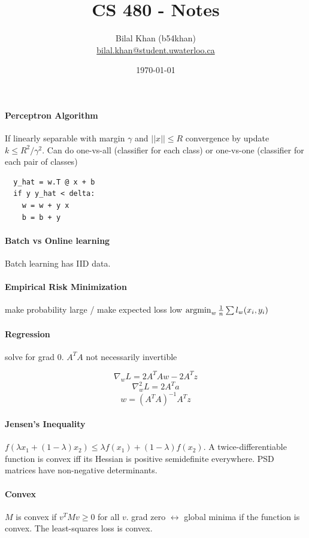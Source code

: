 \documentclass[11pt]{article}
\title{CS 480 - Notes}
\author{Bilal Khan (b54khan)\\
\href{mailto:bilal.khan@student.uwaterloo.ca}{bilal.khan@student.uwaterloo.ca}}
\date{\today}
\begin{document}
\maketitle

\paragraph{Perceptron Algorithm} If linearly separable with margin $\gamma$ and $||x|| \leq R$ convergence by update $k \leq R^2 / \gamma^2$. Can do one-vs-all (classifier for each class) or one-vs-one (classifier for each pair of classes)

\begin{verbatim}
  y_hat = w.T @ x + b
  if y y_hat < delta:
    w = w + y x
    b = b + y
\end{verbatim}

\paragraph{Batch vs Online learning} Batch learning has IID data.

\paragraph{Empirical Risk Minimization} make probability large / make expected loss low $\operatorname*{arg min}_w \frac{1}{n} \sum l_w(x_i, y_i)$

\paragraph{Regression} solve for grad 0. $A^T A$ not necessarily invertible

$$ \nabla_w L = 2 A^T A w - 2 A^T z $$
$$ \nabla^2_w L = 2 A^T a $$
$$ w = (A^T A)^{-1} A^T z $$

\paragraph{Jensen's Inequality} $f(\lambda x_1 + (1 - \lambda) x_2) \leq \lambda f(x_1) + (1 - \lambda) f(x_2)$. A twice-differentiable function is convex iff its Hessian is positive semidefinite everywhere. PSD matrices have non-negative determinants.

\paragraph{Convex} $M$ is convex if $v^T M v \geq 0$ for all $v$. grad zero $\leftrightarrow$ global minima if the function is convex. The least-squares loss is convex.
\end{document}

